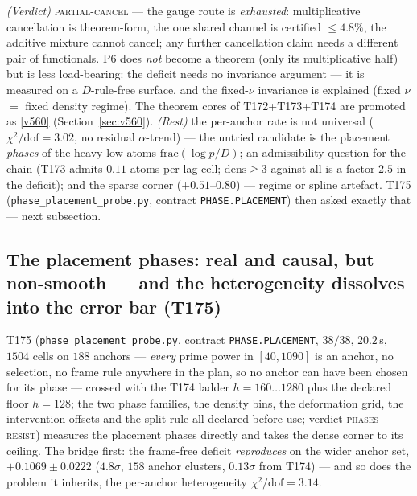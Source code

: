 \documentclass[11pt,a4paper]{article}
\begin{document}
\begin{keybox}
\emph{(Verdict)} \textsc{partial-cancel} --- the gauge route is
\emph{exhausted}: multiplicative cancellation is theorem-form, the one
shared channel is certified $\le4.8\%$, the additive mixture cannot
cancel; any further cancellation claim needs a different pair of
functionals. P6 does \emph{not} become a theorem (only its
multiplicative half) but is less load-bearing: the deficit needs no
invariance argument --- it is measured on a $D$-rule-free surface, and
the fixed-$\nu$ invariance is explained (fixed $\nu$ $=$ fixed density
regime). The theorem cores of T172+T173+T174 are promoted as
\vref{v560} 
(Section~\ref{sec:v560}). \emph{(Rest)} the per-anchor rate is not
universal ($\chi^2/\mathrm{dof}=3.02$, no residual $\alpha$-trend) ---
the untried candidate is the placement \emph{phases} of the heavy low
atoms $\mathrm{frac}(\log p/D)$; an admissibility question for the
chain (T173 admits $0.11$ atoms per lag cell; $\mathrm{dens}\ge3$
against all is a factor $2.5$ in the deficit); and the sparse corner
($+0.51$--$0.80$) --- regime or spline artefact. T175
(\texttt{phase\_placement\_probe.py}, contract
\texttt{PHASE.PLACEMENT}) then asked exactly that --- next subsection.
\end{keybox}

\subsection{The placement phases: real and causal, but non-smooth ---
and the heterogeneity dissolves into the error bar (T175)}\label{sec:t175}
T175 (\texttt{phase\_placement\_probe.py}, contract
\texttt{PHASE.PLACEMENT}, $38/38$, $20.2$\,s, $1504$ cells on $188$
anchors --- \emph{every} prime power in $[40,1090]$ is an anchor, no
selection, no frame rule anywhere in the plan, so no anchor can have
been chosen for its phase --- crossed with the T174 ladder
$h=160\ldots1280$ plus the declared floor $h=128$; the two phase
families, the density bins, the deformation grid, the intervention
offsets and the split rule all declared before use; verdict
\textsc{phases-resist}) measures the placement phases directly and
takes the dense corner to its ceiling. The bridge first: the
frame-free deficit \emph{reproduces} on the wider anchor set,
$+0.1069\pm0.0222$ ($4.8\sigma$, $158$ anchor clusters, $0.13\sigma$
from T174) --- and so does the problem it inherits, the per-anchor
heterogeneity $\chi^2/\mathrm{dof}=3.14$.
\end{document}
